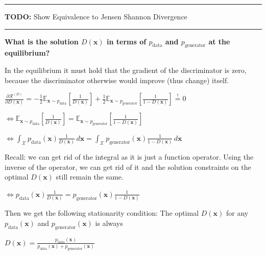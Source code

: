 \documentclass[a2paper,8pt]{extarticle}
\newcommand{\cR}{\mathcal{R}}
\newcommand{\cX}{\mathcal{X}}
\newcommand{\Exp}[2][]{{\mathbb{E}_{#1}}\left[ #2
\right]}
\newcommand{\mbeq}{\stackrel{!}{=}}
\renewcommand{\vec}[1]{\mathbf{#1}}
\newcommand{\vx}{\vec{x}}
\newcommand{\todo}[1]{\textbf{TODO:} #1}
\newcommand{\todo}[1]{%
}
\newcommand{\sep}{\vspace{0pt}\noindent\hrule\vspace{0pt}}
\newcommand{\sep}{\vspace{5pt}\noindent\hrule\vspace{5pt}}
\begin{document}
\begin{landscape}
\begin{multicols*}{7}
\sep

\todo{Show Equivalence to Jensen Shannon Divergence}

\sep

\textbf{What is the solution $D(\vx)$ in terms of $p_{\text{data}}$ and
$p_{\text{generator}}$ at the equilibrium?}

In the equilibrium it must hold that the gradient of the discriminator is zero,
because the discriminator otherwise would improve (thus change) itself.

$
\frac{\partial \cR^{(D)}}{\partial D(\vx)}
=
-\frac{1}{2}
\Exp[\vx\sim p_{\text{data}}]{\frac{1}{D(\vx)}}
+\frac{1}{2}
\Exp[\vx\sim p_{\text{generator}}]{\frac{1}{1-D(\vx)}}
\mbeq 0
$

$
\Longleftrightarrow
\Exp[\vx\sim p_{\text{data}}]{\frac{1}{D(\vx)}}
=
\Exp[\vx\sim p_{\text{generator}}]{\frac{1}{1-D(\vx)}}
$

$
\Longleftrightarrow
\int_{\cX} p_{\text{data}}(\vx)\frac{1}{D(\vx)}\,d\vx
=
\int_{\cX} p_{\text{generator}}(\vx)\frac{1}{1-D(\vx)}\,d\vx
$

Recall: we can get rid of the integral as it is just a function operator. Using
the inverse of the operator, we can get rid of it and the solution constraints
on the optimal $D(\vx)$ still remain the same.

$
\Longleftrightarrow
p_{\text{data}}(\vx)\frac{1}{D(\vx)}
=
p_{\text{generator}}(\vx)\frac{1}{1-D(\vx)}
$

Then we get the following stationarity
condition: The optimal $D(\vx)$ for any $p_{\text{data}}(\vx)$ and
$p_{\text{generator}}(\vx)$ is always

$
D(\vx)
=
\frac{p_{\text{data}}(\vx)}{p_{\text{data}}(\vx) + p_{\text{generator}}(\vx)}
$


\end{multicols*}
\end{landscape}
\end{document}
